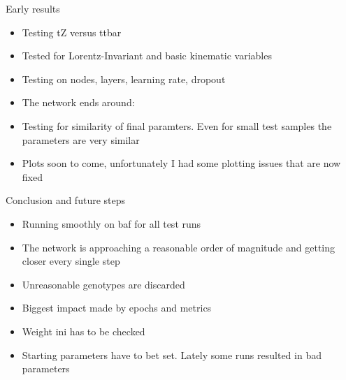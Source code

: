 \begin{frame}{Early results}
	\begin{itemize}
		\item Testing tZ versus ttbar
		\item Tested for Lorentz-Invariant and basic kinematic variables
		\item Testing on nodes, layers, learning rate, dropout
		\item The network ends around:
		\item Testing for similarity of final paramters. Even for small test samples the parameters are very similar
		\item Plots soon to come, unfortunately I had some plotting issues that are now fixed
	\end{itemize}
\end{frame}

\begin{frame}{Conclusion and future steps}
	\begin{itemize}
		\item Running smoothly on baf for all test runs
		\item The network is approaching a reasonable order of magnitude and getting closer every single step
		\item Unreasonable genotypes are discarded
		\item Biggest impact made by epochs and metrics
		\item Weight ini has to be checked
		\item Starting parameters have to bet set. Lately some runs resulted in bad parameters
	\end{itemize}
\end{frame}

